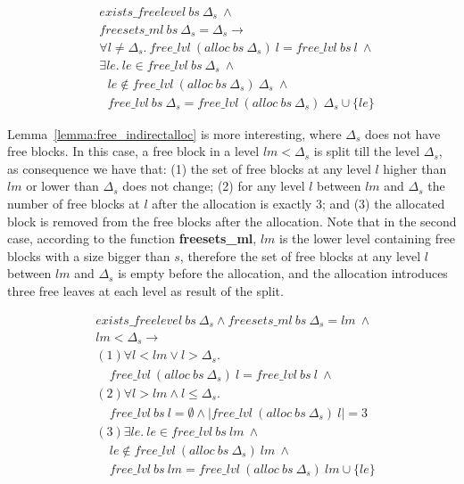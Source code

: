 \begin{lemma} 
\label{lemma:free_directalloc}
\begin{align*}
&exists\_freelevel\ bs\ \Delta_s\ \wedge\\
&freesets\_ml\ bs\ \Delta_s = \Delta_s \longrightarrow\\
&\forall l \ne \Delta_s.\ free\_lvl\ (alloc\ bs\ \Delta_s)\ l =  free\_lvl\ bs\ l\ \wedge\\
&\exists le.\ le \in free\_lvl\ bs\ \Delta_s\ \wedge\\
&\ \ \ le \notin free\_lvl\ (alloc\ bs\ \Delta_s)\ \Delta_s\ \wedge\\
&\ \ \ free\_lvl\ bs\ \Delta_s =  free\_lvl\ (alloc\ bs\ \Delta_s)\ \Delta_s \cup \lbrace le \rbrace
\end{align*}
\end{lemma}

Lemma~\ref{lemma:free_indirectalloc} is more interesting, where $\Delta_s$ does not have free blocks. In this case, a free block in a level $lm < \Delta_s$ is split till the level $\Delta_s$, as consequence we have that: (1) the set of free blocks at any level $l$ higher than $lm$ or lower than $\Delta_s$ does not change; (2) for any level $l$ between $lm$ and $\Delta_s$ the number of free blocks at $l$ after the allocation is exactly $3$; and (3) the allocated block is removed from the free blocks after the allocation. Note that in the second case, according to the function \textbf{freesets\_ml}, $lm$ is the lower level containing free blocks with a size bigger than $s$, therefore the set of free blocks at any level $l$ between $lm$ and $\Delta_s$ is empty before the allocation, and the allocation introduces three free leaves at each level as result of the split.
 
\begin{lemma} 
\label{lemma:free_indirectalloc}
\end{lemma}
\vspace{-7pt}
\begin{align*}
&exists\_freelevel\ bs\ \Delta_s \wedge freesets\_ml\ bs\ \Delta_s = lm\ \wedge\\
&lm < \Delta_s \longrightarrow\\
&(1) \forall l < lm \vee l > \Delta_s.\\
&\ \ \ \ \ free\_lvl\ (alloc\ bs\ \Delta_s)\ l = free\_lvl\ bs\ l\ \wedge\\
&(2) \forall l > lm \wedge l \le \Delta_s.\\
&\ \ \ \ \ free\_lvl\ bs\ l = \emptyset \wedge |free\_lvl\ (alloc\ bs\ \Delta_s)\ l| = 3\\
&(3) \exists le.\ le \in free\_lvl\ bs\ lm\ \wedge\\
&\ \ \ \ \ le \notin free\_lvl\ (alloc\ bs\ \Delta_s)\ lm\ \wedge\\
&\ \ \ \ \ free\_lvl\ bs\ lm = free\_lvl\ (alloc\ bs\ \Delta_s)\ lm \cup \lbrace le \rbrace\ 
\end{align*}

